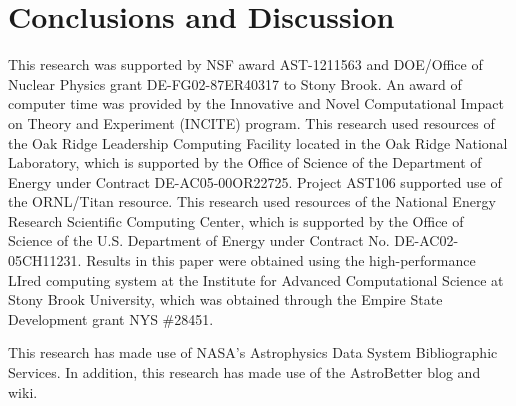 \documentclass[twocolumn,numberedappendix]{../aastex6}
\begin{document}
\section{Conclusions and Discussion}\label{Sec:Conclusions and Discussion}
\label{sec:conclusion}


\acknowledgments

This research was supported by NSF award AST-1211563 and DOE/Office of
Nuclear Physics grant DE-FG02-87ER40317 to Stony Brook. An award of
computer time was provided by the Innovative and Novel Computational
Impact on Theory and Experiment (INCITE) program.  This research used
resources of the Oak Ridge Leadership Computing Facility located in
the Oak Ridge National Laboratory, which is supported by the Office of
Science of the Department of Energy under Contract
DE-AC05-00OR22725. Project AST106 supported use of the ORNL/Titan
resource.  This research used resources of the National Energy
Research Scientific Computing Center, which is supported by the Office
of Science of the U.S. Department of Energy under Contract
No. DE-AC02-05CH11231.  Results in this paper were obtained using the
high-performance LIred computing system at the Institute for Advanced
Computational Science at Stony Brook University, which was obtained
through the Empire State Development grant NYS \#28451.

This research has made use of NASA's Astrophysics Data System 
Bibliographic Services. In addition, this research has made use
of the AstroBetter blog and wiki.

\clearpage





\clearpage
\appendix
\end{document}
